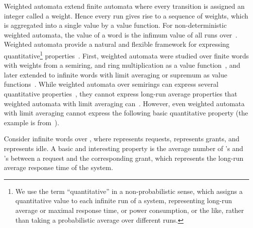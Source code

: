 \documentclass{lmcs}
\begin{document}
\smallskip{}
Weighted automata extend finite automata where every transition is
assigned an integer called a weight.
Hence every run gives rise to a sequence of weights, which is
aggregated into a single value by a value function.
For non-deterministic weighted automata, the value of a word
 is the infimum value of all runs over~.
Weighted automata provide a natural and flexible framework for
expressing quantitative\footnote{We use the term ``quantitative'' in a
non-probabilistic sense, which assigns a quantitative value to each
infinite run of a system, representing long-run average or maximal
response time, or power consumption, or the like, rather than taking a
probabilistic average over different runs.}
properties~\cite{Chatterjee08quantitativelanguages}.
First, weighted automata were studied over finite words with weights
from a semiring, and ring multiplication as a value function~\cite{Droste:2009:HWA:1667106},
and later extended to infinite words with limit averaging or supremum as
value functions~\cite{Chatterjee08quantitativelanguages,DBLP:journals/corr/abs-1007-4018,Chatterjee:2009:AWA:1789494.1789497}.
While weighted automata over semirings can express several
quantitative properties~\cite{DBLP:journals/jalc/Mohri02}, they cannot
express long-run average properties that weighted automata with limit
averaging can~\cite{Chatterjee08quantitativelanguages}.
However, even weighted automata with limit averaging cannot express
the following basic quantitative property (the example is from~\cite{nested}).


\begin{exa}\label{ex:intro}
Consider infinite words over , where  represents
requests,  represents grants, and  represents idle. A
basic and interesting property is the average number of 's and 's
between a request and the corresponding grant, which represents the
long-run average response time of the system.
\end{exa}
\end{document}
